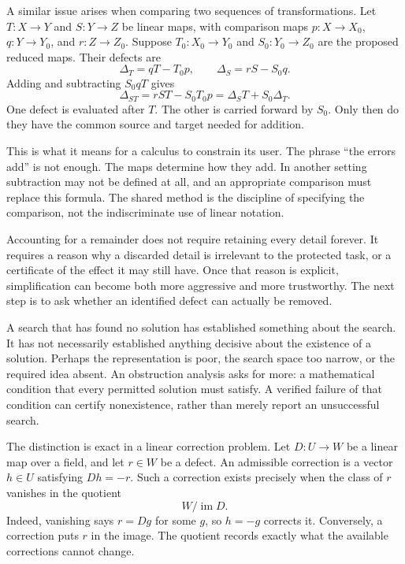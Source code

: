 A similar issue arises when comparing two sequences of transformations. Let \(T:X\to Y\) and \(S:Y\to Z\) be linear maps, with comparison maps \(p:X\to X_0\), \(q:Y\to Y_0\), and \(r:Z\to Z_0\). Suppose \(T_0:X_0\to Y_0\) and \(S_0:Y_0\to Z_0\) are the proposed reduced maps. Their defects are
\[
\Delta_T=qT-T_0p,
\qquad
\Delta_S=rS-S_0q.
\]
Adding and subtracting \(S_0qT\) gives
\begin{equation}\label{eq:composition}
\Delta_{ST}=rST-S_0T_0p
=\Delta_S T+S_0\Delta_T.
\end{equation}
One defect is evaluated after \(T\). The other is carried forward by \(S_0\). Only then do they have the common source and target needed for addition.

This is what it means for a calculus to constrain its user. The phrase ``the errors add'' is not enough. The maps determine how they add. In another setting subtraction may not be defined at all, and an appropriate comparison must replace this formula. The shared method is the discipline of specifying the comparison, not the indiscriminate use of linear notation.

Accounting for a remainder does not require retaining every detail forever. It requires a reason why a discarded detail is irrelevant to the protected task, or a certificate of the effect it may still have. Once that reason is explicit, simplification can become both more aggressive and more trustworthy. The next step is to ask whether an identified defect can actually be removed.


A search that has found no solution has established something about the search. It has not necessarily established anything decisive about the existence of a solution. Perhaps the representation is poor, the search space too narrow, or the required idea absent. An obstruction analysis asks for more: a mathematical condition that every permitted solution must satisfy. A verified failure of that condition can certify nonexistence, rather than merely report an unsuccessful search.

The distinction is exact in a linear correction problem. Let \(D:U\to W\) be a linear map over a field, and let \(r\in W\) be a defect. An admissible correction is a vector \(h\in U\) satisfying \(Dh=-r\). Such a correction exists precisely when the class of \(r\) vanishes in the quotient
\[
W/\operatorname{im}D.
\]
Indeed, vanishing says \(r=Dg\) for some \(g\), so \(h=-g\) corrects it. Conversely, a correction puts \(r\) in the image. The quotient records exactly what the available corrections cannot change.

